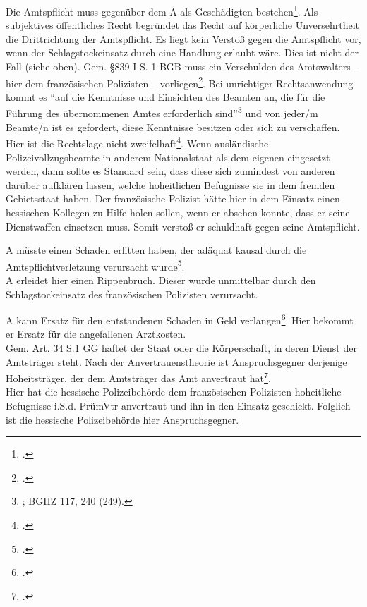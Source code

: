 \documentclass[widefront, ngerman]{jura}
\begin{document}
Die Amtspflicht muss gegenüber dem A als Geschädigten bestehen\footcite[Rn 1066f.]{detterbeckVerwR}. Als subjektives öffentliches Recht begründet das Recht auf körperliche Unversehrtheit die Drittrichtung der Amtspflicht.
Es liegt kein Verstoß gegen die Amtspflicht vor, wenn der Schlagstockeinsatz durch eine Handlung erlaubt wäre. Dies ist nicht der Fall (siehe oben).
\levelup {}
Gem. §839 I S. 1 BGB muss ein Verschulden des Amtswalters -- hier dem französischen Polizisten -- vorliegen\footcite[S. 72]{Ossenbuehl}. Bei unrichtiger Rechtsanwendung kommt es "`auf die Kenntnisse und Einsichten des Beamten an, die für die Führung des übernommenen Amtes erforderlich sind"'\footnote{\cite[S. 74]{Ossenbuehl}; BGHZ 117, 240 (249).} und von jeder/m Beamte/n ist es gefordert, diese Kenntnisse besitzen oder sich zu verschaffen.\\
Hier ist die Rechtslage nicht zweifelhaft\footcite[Rn 1081]{detterbeckVerwR}. Wenn ausländische Polizeivollzugsbeamte in anderem Nationalstaat als dem eigenen eingesetzt werden, dann sollte es Standard sein, dass diese sich zumindest von anderen darüber aufklären lassen, welche hoheitlichen Befugnisse sie in dem fremden Gebietsstaat haben. Der französische Polizist hätte hier in dem Einsatz einen hessischen Kollegen zu Hilfe holen sollen, wenn er absehen konnte, dass er seine Dienstwaffen einsetzen muss. Somit verstoß er schuldhaft gegen seine Amtspflicht.

A müsste einen Schaden erlitten haben, der adäquat kausal durch die Amtspflichtverletzung verursacht wurde\footcite[§9 Rn 163ff.]{DetterbeckStaatshaftung}.\\
A erleidet hier einen Rippenbruch. Dieser wurde unmittelbar durch den Schlagstockeinsatz des französischen Polizisten verursacht.

A kann Ersatz für den entstandenen Schaden in Geld verlangen\footcite[Rn 1093]{detterbeckVerwR}. Hier bekommt er Ersatz für die angefallenen Arztkosten.\\
Gem. Art. 34 S.1 GG haftet der Staat oder die Körperschaft, in deren Dienst der Amtsträger steht.
Nach der Anvertrauenstheorie ist Anspruchsgegner derjenige Hoheitsträger, der dem Amtsträger das Amt anvertraut hat\footcite[Rn 1096]{detterbeckVerwR}.\\
Hier hat die hessische Polizeibehörde dem französischen Polizisten hoheitliche Befugnisse i.S.d. PrümVtr anvertraut und ihn in den Einsatz geschickt. Folglich ist die hessische Polizeibehörde hier Anspruchsgegner.
\end{document}
